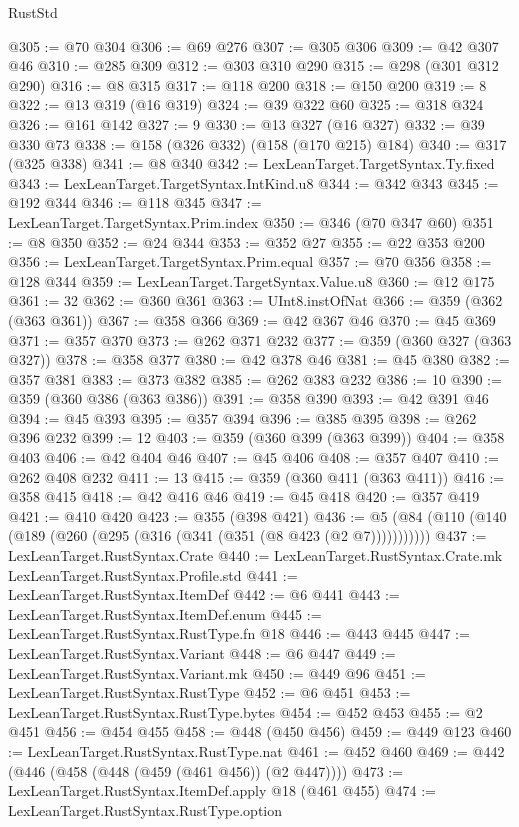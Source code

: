 \begin{lexlean}{RustStd}
\begin{coremodule}
@305 := @70 @304
@306 := @69 @276
@307 := @305 @306
@309 := @42 @307 @46
@310 := @285 @309
@312 := @303 @310 @290
@315 := @298 (@301 @312 @290)
@316 := @8 @315
@317 := @118 @200
@318 := @150 @200
@319 := 8
@322 := @13 @319 (@16 @319)
@324 := @39 @322 @60
@325 := @318 @324
@326 := @161 @142
@327 := 9
@330 := @13 @327 (@16 @327)
@332 := @39 @330 @73
@338 := @158 (@326 @332) (@158 (@170 @215) @184)
@340 := @317 (@325 @338)
@341 := @8 @340
@342 := LexLeanTarget.TargetSyntax.Ty.fixed
@343 := LexLeanTarget.TargetSyntax.IntKind.u8
@344 := @342 @343
@345 := @192 @344
@346 := @118 @345
@347 := LexLeanTarget.TargetSyntax.Prim.index
@350 := @346 (@70 @347 @60)
@351 := @8 @350
@352 := @24 @344
@353 := @352 @27
@355 := @22 @353 @200
@356 := LexLeanTarget.TargetSyntax.Prim.equal
@357 := @70 @356
@358 := @128 @344
@359 := LexLeanTarget.TargetSyntax.Value.u8
@360 := @12 @175
@361 := 32
@362 := @360 @361
@363 := UInt8.instOfNat
@366 := @359 (@362 (@363 @361))
@367 := @358 @366
@369 := @42 @367 @46
@370 := @45 @369
@371 := @357 @370
@373 := @262 @371 @232
@377 := @359 (@360 @327 (@363 @327))
@378 := @358 @377
@380 := @42 @378 @46
@381 := @45 @380
@382 := @357 @381
@383 := @373 @382
@385 := @262 @383 @232
@386 := 10
@390 := @359 (@360 @386 (@363 @386))
@391 := @358 @390
@393 := @42 @391 @46
@394 := @45 @393
@395 := @357 @394
@396 := @385 @395
@398 := @262 @396 @232
@399 := 12
@403 := @359 (@360 @399 (@363 @399))
@404 := @358 @403
@406 := @42 @404 @46
@407 := @45 @406
@408 := @357 @407
@410 := @262 @408 @232
@411 := 13
@415 := @359 (@360 @411 (@363 @411))
@416 := @358 @415
@418 := @42 @416 @46
@419 := @45 @418
@420 := @357 @419
@421 := @410 @420
@423 := @355 (@398 @421)
@436 := @5 (@84 (@110 (@140 (@189 (@260 (@295 (@316 (@341 (@351 (@8 @423 (@2 @7)))))))))))
@437 := LexLeanTarget.RustSyntax.Crate
@440 := LexLeanTarget.RustSyntax.Crate.mk LexLeanTarget.RustSyntax.Profile.std
@441 := LexLeanTarget.RustSyntax.ItemDef
@442 := @6 @441
@443 := LexLeanTarget.RustSyntax.ItemDef.enum
@445 := LexLeanTarget.RustSyntax.RustType.fn @18
@446 := @443 @445
@447 := LexLeanTarget.RustSyntax.Variant
@448 := @6 @447
@449 := LexLeanTarget.RustSyntax.Variant.mk
@450 := @449 @96
@451 := LexLeanTarget.RustSyntax.RustType
@452 := @6 @451
@453 := LexLeanTarget.RustSyntax.RustType.bytes
@454 := @452 @453
@455 := @2 @451
@456 := @454 @455
@458 := @448 (@450 @456)
@459 := @449 @123
@460 := LexLeanTarget.RustSyntax.RustType.nat
@461 := @452 @460
@469 := @442 (@446 (@458 (@448 (@459 (@461 @456)) (@2 @447))))
@473 := LexLeanTarget.RustSyntax.ItemDef.apply @18 (@461 @455)
@474 := LexLeanTarget.RustSyntax.RustType.option

\end{coremodule}
\end{lexlean}
